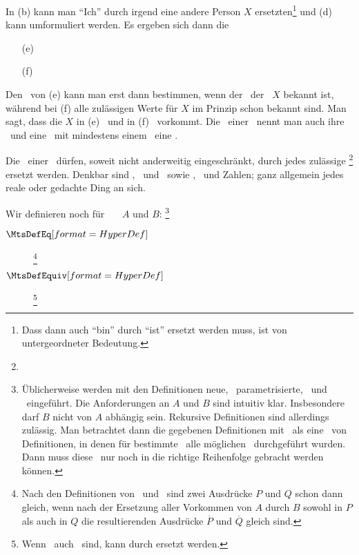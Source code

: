 In (b) kann man "`Ich"' durch irgend eine andere Person $X$ ersetzten\footnote{Dass dann auch "`bin"' durch "`ist"' ersetzt werden muss, ist von untergeordneter Bedeutung.} und (d) kann umformuliert werden.
Es ergeben sich dann die \Aussagen
\begin{enumerate}
	\item[(e)] \label{Bsp:e} 
	\item[(f)] \label{Bsp:f} 
\end{enumerate}
Den \Wahrheitswert\ von (e) kann man erst dann bestimmen, wenn der \Wert\ der \Variablen\ $X$ bekannt ist, während bei (f) alle zulässigen Werte für $X$ im Prinzip schon bekannt sind.
Man sagt, dass die \Variable $X$ in (e) \freiV\ und in (f) \gebundenV\ vorkommt.
Die \freienVariablen\ einer \Aussage\ nennt man auch ihre \Parameter\ und eine \Aussage\ mit mindestens einem \Parameter\ eine \parametrisierteAussage.

Die \Parameter\ einer \Aussage\ dürfen, soweit nicht anderweitig eingeschränkt, durch jedes zulässige \DefFt{\Objekt}\footnote{} ersetzt werden.
Denkbar sind \Symbole, \Formeln\ und \Aussagen\ sowie \Mengen, \Symbolfolgen\ und Zahlen; ganz allgemein jedes reale oder gedachte Ding an sich.

Wir definieren noch für \Aussagen\ \textbzw\ \Objekte\ $A$ und $B$:%
\footnote{%
	Üblicherweise werden mit den Definitionen neue, \textggf\ parametrisierte, \Begriffe\ und \Symbole\ eingeführt.
	Die Anforderungen an $A$ und $B$ sind intuitiv klar.
	Insbesondere darf $B$ nicht von $A$ abhängig sein.
	Rekursive Definitionen sind allerdings zulässig.
	Man betrachtet dann die gegebenen Definitionen mit \Parametern\ als eine \Menge\ von Definitionen, in denen für bestimmte \Parameter\ alle möglichen \Ersetzungen\ durchgeführt wurden.
	Dann muss diese \Menge\ nur noch in die richtige Reihenfolge gebracht werden können.
}
\begin{description}
	\item[] 
	\item[$\defSym{\MtsDefEq}$]  %
	\footnote{%
		Nach den Definitionen von \MtsDefEquiv\ und \MtsDefEq\ sind zwei Ausdrücke $P$ und $Q$ schon dann gleich, wenn nach der Ersetzung aller Vorkommen von $A$ durch $B$ sowohl in $P$ als auch in $Q$ die resultierenden Ausdrücke $\overline{P}$ und $\overline{Q}$ gleich sind.
	}
	\item[$\defSym{\MtsDefEquiv}$]  %
	\footnote{%
		Wenn \Aussagen\ auch \Objekte\ sind, kann \MtsDefEquiv durch \MtsDefEq ersetzt werden.
	}
\end{description}


